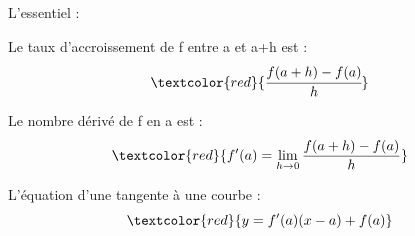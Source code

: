 \documentclass[t]{beamer}
\begin{document}
	\begin{frame}{L'essentiel :}
		\pause
		\begin{exampleblock}{Le taux d'accroissement de f entre a et a+h est :}
			\pause
			\[\textcolor{red}{ \cfrac{f(a+h) - f(a)}{h} }\]
			\pause
		\end{exampleblock}

		\begin{exampleblock}{Le nombre dérivé de f en a est : }
			\pause
			\[\textcolor{red}{f'(a) = \lim\limits_{h \rightarrow 0}\dfrac{f(a+h) - f(a)}{h}} \]
			\pause
		\end{exampleblock}
		
		\begin{exampleblock}{L'équation d'une tangente à une courbe :}
			\pause
			\[\textcolor{red}{y = f'(a)(x-a)+f(a)} \]
			\pause
		\end{exampleblock}
	\end{frame}
\end{document}

